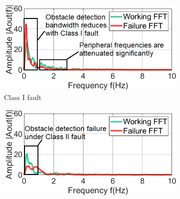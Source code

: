 \begin{figure}%
	\centering
	\begin{subfigure}[t]{0.33\textwidth}
		\centering
		\includegraphics[width=\textwidth]{figures/2-PIR-Fault/normal-classI/class1_fft_coloradj_small_edited_camera_ready.png}
		\caption{Class I fault}
		\label{fig:classI_fault_freq}
	\end{subfigure}
	\begin{subfigure}[t]{0.33\textwidth}
		\centering
		\includegraphics[width=\textwidth]{figures/2-PIR-Fault/normal-classII-deformed/class2_fft_coloradj_small_edited_camera_ready.png}

\end{subfigure}
\end{figure}
